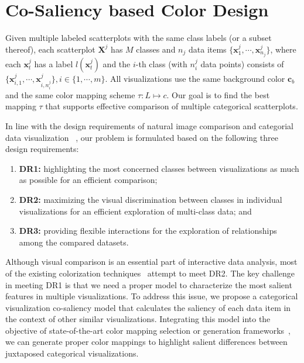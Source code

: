 \section{Co-Saliency based Color Design}
Given multiple labeled scatterplots with the same class labels (or a subset thereof), each scatterplot $\mathbf{X}^j$ has $M$ classes and $n_j$ data items $\{\mathbf{x}^j_1, \cdots, \mathbf{x}^j_{n_j}\}$, where each $\mathbf{x}^j_t$ has a label
$l(\mathbf{x}^j_t)$ and the $i$-th class (with $n^j_i$ data points) consists of $\{\mathbf{x}_{i,1}^j, \cdots , \mathbf{x}_{i,n^j_i}^j\}, i \in  \{ 1, \cdots, m \} $.
All visualizations use the same  background color $\mathbf{c}_b$ and the same color mapping scheme $\tau: L \mapsto c$. Our goal is to find the best mapping $\tau$ that supports effective comparison of multiple categorical scatterplots.

In line with the design requirements of natural image comparison and categorial data visualization ~\cite{Jacobs10,Gleicher18,Lu21},
our problem is formulated based on the following three design requirements:
\begin{enumerate}[label=(\roman*),nosep]
\item \textbf{DR1:} highlighting the most concerned classes between visualizations as much as possible for an efficient comparison;
\item \textbf{DR2:} maximizing the visual discrimination between classes in individual visualizations for an efficient exploration of multi-class data; and
\item \textbf{DR3:} providing flexible interactions for the exploration of relationships among the compared datasets.
\end{enumerate}
Although visual comparison is an essential part of interactive data analysis, most of  the existing  colorization techniques~\cite{Gramazio17, Lu21} attempt to meet DR2. The key challenge in meeting DR1 is that we need a proper model to characterize the most salient features in multiple visualizations.
To address this issue, we propose a categorical visualization co-saliency model that calculates the saliency of each data item in the context of other similar visualizations. Integrating this model into the objective of state-of-the-art color mapping selection or generation frameworks~\cite{Wang2018,Lu21}, we can
generate proper color mappings to highlight salient differences between juxtaposed categorical visualizations.

